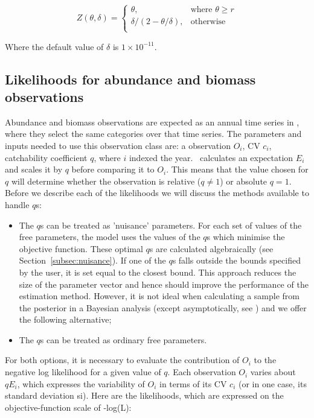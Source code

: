 \begin{equation}
	Z \left(\theta,\delta \right) = \begin{cases}
	\theta, & \text{where $\theta \ge r$} \\
	\delta/\left( 2-\theta/\delta \right), & \text{otherwise} \\
	\end{cases}
\end{equation}

Where the default value of $\delta$ is $1 \times 10^{-11}$.

\subsection{Likelihoods for abundance and biomass observations} \label{Obs:biomass}

Abundance and biomass observations are expected as an annual time series in \CNAME, where they select the same categories over that time series. The parameters and inputs needed to use this observation class are: a observation $O_i$, CV $c_i$, catchability coefficient $q$, where $i$ indexed the year. \CNAME\ calculates an expectation $E_i$ and scales it by $q$ before comparing it to $O_i$. This means that the value chosen for $q$ will determine whether the observation is relative ($q\neq 1$) or absolute $q = 1$. Before we describe each of the likelihoods we will discuss the methods available to handle $q$s:

\begin{itemize}
	\item The $q$s can be treated as 'nuisance' parameters. For each set of values of the free parameters, the model uses the values of the $q$s which minimise the objective function. These optimal $q$s are calculated algebraically (see Section~\ref{subsec:nuisance}). If one of the $q$s falls outside the bounds specified by the user, it is set equal to the closest bound. This approach reduces the size of the parameter vector and hence should improve the performance of the estimation method. However, it is not ideal when calculating a sample from the posterior in a Bayesian analysis (except asymptotically, see \cite{Walters_ludwig_94}) and we offer the following alternative;
	\item The $q$s can be treated as ordinary free parameters.
\end{itemize}

For both options, it is necessary to evaluate the contribution of $O_i$ to the negative log likelihood for a given value of $q$. Each observation $O_i$ varies about $qE_i$, which expresses the variability of $O_i$ in terms of its CV $c_i$ (or in one case, its standard deviation si). Here are the likelihoods, which are expressed on the objective-function scale of -log(L):


